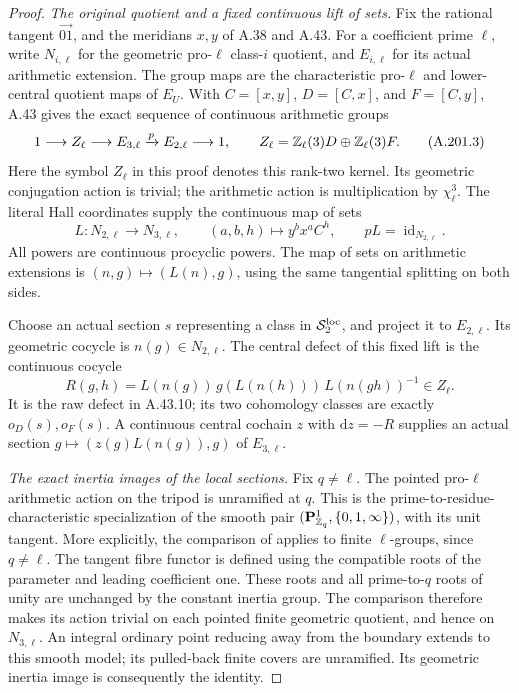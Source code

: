 \begin{proof}
\emph{The original quotient and a fixed continuous lift of sets.}
Fix the rational tangent \(\overrightarrow{01}\), and the
meridians \(x,y\) of A.38 and A.43.  For a coefficient prime
\(\ell\), write \(N_{i,\ell}\) for the geometric pro-\(\ell\)
class-\(i\) quotient, and \(E_{i,\ell}\) for its actual
arithmetic extension.  The group maps are the characteristic
pro-\(\ell\) and lower-central quotient maps of \(E_U\).
With \(C=[x,y]\), \(D=[C,x]\), and \(F=[C,y]\), A.43
gives the exact sequence of continuous arithmetic groups
\[
 1\longrightarrow Z_\ell
 \longrightarrow E_{3,\ell}\xrightarrow{p}E_{2,\ell}
 \longrightarrow1,\qquad
 Z_\ell=\Z_\ell(3)D\oplus\Z_\ell(3)F.
\tag{A.201.3}
\]
Here the symbol \(Z_\ell\) in this proof denotes this
rank-two kernel.  Its geometric conjugation action is trivial;
the arithmetic action is multiplication by \(\chi_\ell^3\).
The literal Hall coordinates supply the continuous map of sets
\[
 L:N_{2,\ell}\longrightarrow N_{3,\ell},\qquad
        (a,b,h)\longmapsto y^bx^aC^h,
                  \qquad pL=\operatorname{id}_{N_{2,\ell}}.
\tag{A.201.4}
\]
All powers are continuous procyclic powers.  The map of sets
on arithmetic extensions is \((n,g)\mapsto(L(n),g)\), using
the same tangential splitting on both sides.

Choose an actual section \(s\) representing a class in
\(\mathscr S^{\rm loc}_2\), and project it to \(E_{2,\ell}\).
Its geometric cocycle is \(n(g)\in N_{2,\ell}\).  The
central defect of this fixed lift is the continuous cocycle
\[
 R(g,h)=L(n(g))\,g(L(n(h)))\,L(n(gh))^{-1}\in Z_\ell.
\tag{A.201.5}
\]
It is the raw defect in A.43.10; its two cohomology classes
are exactly \(o_D(s),o_F(s)\).  A continuous central cochain
\(z\) with \(\mathrm dz=-R\) supplies an actual section
\(g\mapsto(z(g)L(n(g)),g)\) of \(E_{3,\ell}\).

\emph{The exact inertia images of the local sections.}
Fix \(q\ne\ell\).  The pointed pro-\(\ell\) arithmetic
action on the tripod is unramified at \(q\).  This is the
prime-to-residue-characteristic specialization of the smooth
pair \((\mathbf P^1_{\Z_q},\{0,1,\infty\})\), with its
unit tangent.  More explicitly, the comparison of
\cite[Expos\'e XIII, Corollary 2.9 and \S2.10,
pp.288--290]{AgentSGA1} applies to finite \(\ell\)-groups,
since \(q\ne\ell\).  The tangent fibre functor is defined
using the compatible roots of the parameter and leading
coefficient one.  These roots and all prime-to-\(q\) roots
of unity are unchanged by the constant inertia group.
The comparison therefore makes its action trivial on each
pointed finite geometric quotient, and hence on
\(N_{3,\ell}\).  An integral ordinary point reducing away
from the boundary extends to this smooth model; its pulled-back
finite covers are unramified.  Its geometric inertia image
is consequently the identity.


\end{proof}
